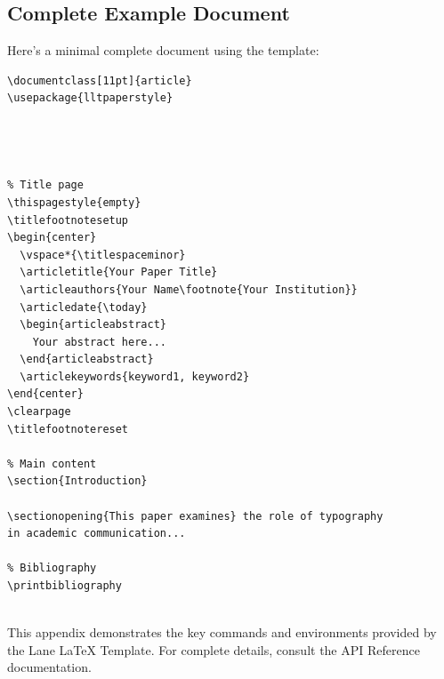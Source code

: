 
\subsection{Complete Example Document}

Here's a minimal complete document using the template:

\begin{verbatim}
\documentclass[11pt]{article}
\usepackage{lltpaperstyle}




% Title page
\thispagestyle{empty}
\titlefootnotesetup
\begin{center}
  \vspace*{\titlespaceminor}
  \articletitle{Your Paper Title}
  \articleauthors{Your Name\footnote{Your Institution}}
  \articledate{\today}
  \begin{articleabstract}
    Your abstract here...
  \end{articleabstract}
  \articlekeywords{keyword1, keyword2}
\end{center}
\clearpage
\titlefootnotereset

% Main content
\section{Introduction}

\sectionopening{This paper examines} the role of typography
in academic communication...

% Bibliography
\printbibliography


\end{verbatim}

This appendix demonstrates the key commands and environments provided by the Lane LaTeX Template. For complete details, consult the API Reference documentation.